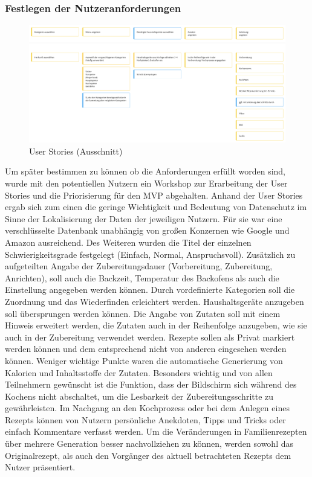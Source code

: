 \subsubsection{Festlegen der Nutzeranforderungen}
\label{sec:userstories}
\begin{figure}[h] %
    \includegraphics[width=1\textwidth]{images/userstories.png}
    \caption[User Stories (Ausschnitt)]{User Stories (Ausschnitt)}
    \label{fig:userstories}
\end{figure}
Um später bestimmen zu können ob die Anforderungen erfüllt worden sind, wurde mit den potentiellen Nutzern ein Workshop zur Erarbeitung der User Stories und die Priorisierung für den MVP abgehalten. Anhand der User Stories ergab sich zum einen die geringe Wichtigkeit und Bedeutung von Datenschutz im Sinne der Lokalisierung der Daten der jeweiligen Nutzern. Für sie war eine verschlüsselte Datenbank unabhängig von großen Konzernen wie Google und Amazon ausreichend. Des Weiteren wurden die Titel der einzelnen Schwierigkeitsgrade festgelegt (Einfach, Normal, Anspruchsvoll). Zusätzlich zu aufgeteilten Angabe der Zubereitungsdauer (Vorbereitung, Zubereitung, Anrichten), soll auch die Backzeit, Temperatur des Backofens als auch die Einstellung angegeben werden können. Durch vordefinierte Kategorien soll die Zuordnung und das Wiederfinden erleichtert werden. Haushaltsgeräte anzugeben soll übersprungen werden können. Die Angabe von Zutaten soll mit einem Hinweis erweitert werden, die Zutaten auch in der Reihenfolge anzugeben, wie sie auch in der Zubereitung verwendet werden. Rezepte sollen als Privat markiert werden können und dem entsprechend nicht von anderen eingesehen werden können. Weniger wichtige Punkte waren die automatische Generierung von Kalorien und Inhaltsstoffe der Zutaten. Besonders wichtig und von allen Teilnehmern gewünscht ist die Funktion, dass der Bildschirm sich während des Kochens nicht abschaltet, um die Lesbarkeit der Zubereitungsschritte zu gewährleisten. Im Nachgang an den Kochprozess oder bei dem Anlegen eines Rezepts können von Nutzern persönliche Anekdoten, Tipps und Tricks oder einfach Kommentare verfasst werden. Um die Veränderungen in Familienrezepten über mehrere Generation besser nachvollziehen zu können, werden sowohl das Originalrezept, als auch den Vorgänger des aktuell betrachteten Rezepts dem Nutzer präsentiert.

